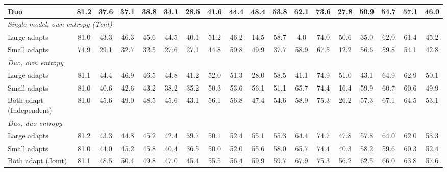 \begin{table}[t]
{\begin{tabular}{l|c|ccc|cccc|cccc|cccc|c}
        \quad Duo & 81.2 & 37.6 & 37.1 & 38.8 & 34.1 & 28.5 & 41.6 & 44.4 & 48.4 & 53.8 & 62.1 & 73.6 & 27.8 & 50.9 & 54.7 & 57.1 & 46.0 \\
        \midrule
        \multicolumn{18}{l}{\textit{Single model, own entropy (Tent)}} \\
        \quad Large adapts & 81.0 & 43.3 & 46.3 & 45.6 & 44.5 & 40.1 & 51.2 & 46.2 & 14.5 & 58.7 & 4.0 & 74.0 & 50.6 & 35.0 & 62.0 & 61.4 & 45.2 \\
        \quad Small adapts & 74.9 & 29.1 & 32.7 & 32.5 & 27.6 & 27.1 & 44.8 & 50.8 & 49.9 & 37.7 & 58.9 & 67.5 & 12.2 & 56.6 & 59.8 & 54.1 & 42.8 \\
        \midrule
        \multicolumn{18}{l}{\textit{Duo, own entropy}} \\
        \quad Large adapts & 81.1 & 44.4 & 46.9 & 46.5 & 44.8 & 41.2 & 52.0 & 51.3 & 28.0 & 58.5 & 41.1 & 74.9 & 51.0 & 43.1 & 64.9 & 62.9 & 50.1 \\
        \quad Small adapts & 81.0 & 40.6 & 42.6 & 43.2 & 38.2 & 35.2 & 50.3 & 53.6 & 56.1 & 51.1 & 65.7 & 74.4 & 16.4 & 59.9 & 60.7 & 60.6 & 49.9 \\
        \quad Both adapt (Independent) & 81.0 & 45.6 & 49.0 & 48.5 & 45.6 & 43.1 & 56.1 & 56.8 & 47.4 & 54.6 & 58.9 & 75.3 & 26.2 & 57.3 & 67.1 & 64.5 & 53.1 \\
        \midrule
        \multicolumn{18}{l}{\textit{Duo, duo entropy}} \\
        \quad Large adapts & 81.2 & 43.3 & 44.8 & 45.2 & 42.4 & 39.7 & 50.1 & 52.4 & 55.1 & 55.3 & 64.4 & 74.7 & 47.8 & 57.8 & 64.0 & 62.0 & 53.3 \\
        \quad Small adapts & 81.0 & 44.0 & 45.2 & 45.8 & 40.4 & 36.5 & 50.0 & 52.0 & 55.6 & 58.0 & 65.7 & 74.4 & 40.3 & 58.2 & 59.6 & 60.3 & 52.4 \\
        \quad Both adapt (Joint) & 81.1 & 48.5 & 50.4 & 49.8 & 47.0 & 45.4 & 55.5 & 56.4 & 59.9 & 59.7 & 67.9 & 75.3 & 56.2 & 62.5 & 66.0 & 63.8 & 57.6 \\
        \bottomrule
    \end{tabular}%
    }
\end{table}
